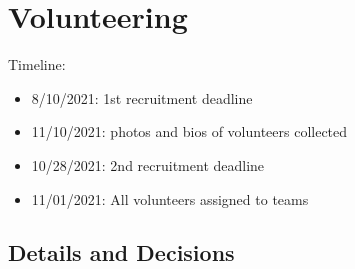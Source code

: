 \documentclass[%
10pt,								%
]
{scrartcl}
\begin{document}
\section{Volunteering}
    Timeline:
    \begin{itemize}
        \item   8/10/2021: 1st recruitment deadline
        \item   11/10/2021: photos and bios of volunteers collected
        \item   10/28/2021: 2nd recruitment deadline
        \item   11/01/2021: All volunteers assigned to teams
    \end{itemize}
    
    \subsection{Details and Decisions}
\end{document}
